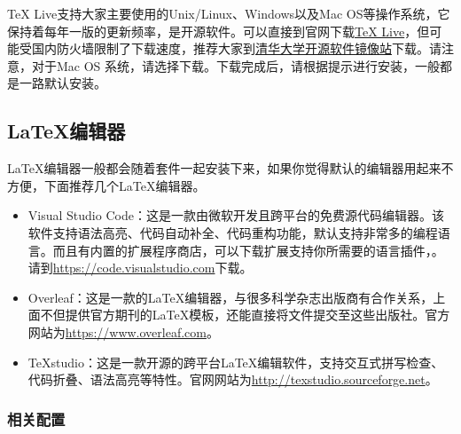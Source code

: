 \TeX{} Live支持大家主要使用的Unix/Linux、Windows以及Mac OS等操作系统，它保持着每年一版的更新频率，是开源软件。可以直接到\href{https://www.tug.org}{}官网下载\href{https://www.tug.org/texlive}{\TeX{} Live}，但可能受国内防火墙限制了下载速度，推荐大家到\href{https://mirrors.tuna.tsinghua.edu.cn/CTAN/}{清华大学开源软件镜像站}下载。请注意，对于Mac OS 系统，请选择下载。下载完成后，请根据提示进行安装，一般都是一路默认安装。

\subsection{\LaTeX{}编辑器}

\LaTeX{}编辑器一般都会随着套件一起安装下来，如果你觉得默认的编辑器用起来不方便，下面推荐几个\LaTeX{}编辑器。
\begin{itemize}
    \item Visual Studio Code：这是一款由微软开发且跨平台的免费源代码编辑器。该软件支持语法高亮、代码自动补全、代码重构功能，默认支持非常多的编程语言。而且有内置的扩展程序商店，可以下载扩展支持你所需要的语言插件，。请到\url{https://code.visualstudio.com}下载。
    \item Overleaf：这是一款的\LaTeX{}编辑器，与很多科学杂志出版商有合作关系，上面不但提供官方期刊的\LaTeX{}模板，还能直接将文件提交至这些出版社。官方网站为\url{https://www.overleaf.com}。
    \item TeXstudio：这是一款开源的跨平台\LaTeX{}编辑软件，支持交互式拼写检查、代码折叠、语法高亮等特性。官网网站为\url{http://texstudio.sourceforge.net}。
\end{itemize}

\subsubsection{相关配置}

